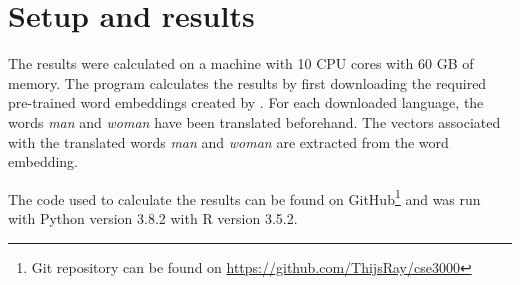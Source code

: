 \section{Setup and results}
The results were calculated on a machine with 10 CPU cores with 60 GB of 
memory. The program calculates the results by first downloading
the required pre-trained word embeddings created by \textcite{grave2018learning}. 
For each downloaded language, the words \textit{man} and \textit{woman} have been
translated beforehand.
The vectors associated with the translated words \textit{man} and \textit{woman} are
extracted from the word embedding. 

The code used to calculate the results can be found on 
GitHub\footnote{Git repository can be found on \url{https://github.com/ThijsRay/cse3000}} 
and was run with Python version 3.8.2 with R version 3.5.2. 




